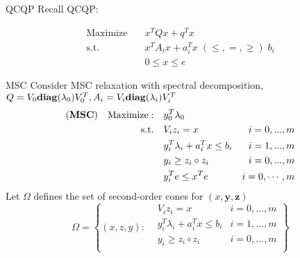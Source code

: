 

\usepackage{subfig}
\usepackage[style=authoryear]{biblatex}
\usepackage{bm}

\date{\today}




\fontsize{9pt}{11}\selectfont
\frame{\titlepage}
\begin{frame}{QCQP}
  Recall QCQP:

  \begin{equation}
    \begin{aligned}
      \mathrm{Maximize}\quad & x^TQx + q^T x                                   \\
      \mathrm{s.t.}  \quad   & x^{T} A_i x  + a_i^Tx   \; (\le, =, \ge) \; b_i \\
                             & 0\le x\le e
    \end{aligned}
  \end{equation}
\end{frame}
\begin{frame}{MSC}
  Consider MSC relaxation with spectral decomposition, \(Q =V_0 \mathbf{diag} (\lambda_0) V_0^T, A_i = V_i \mathbf{diag} (\lambda_i) V_i^T\)
  \begin{equation}\label{eq.rel.msc}
    \begin{aligned}
      (\textbf{MSC}) \quad \mathrm{Maximize: }\quad & y_0 ^T\lambda_0                                     \\
      \mathrm{s.t.} \quad                        & V_i z_i = x                        & i=0,...,m      \\
                                                 & y_i ^T\lambda_i  + a_i^Tx  \le b_i & i=1,...,m      \\
                                                 & y_i \ge z_i \circ z_i              & i=0,...,m      \\
                                                 & y_i^Te \le x^Te                    & i=0, \cdots, m
    \end{aligned}
  \end{equation}
  Let \(\Omega\) defines the set of second-order cones for \((x, \bm y, \bm z)\)
  \begin{equation}
    \Omega = \left\{ (x,z,y) :  \begin{aligned}
       & V_i z_i = x                        & i=0,...,m \\
       & y_i ^T\lambda_i  + a_i^Tx  \le b_i & i=1,...,m \\
       & y_i \ge z_i \circ z_i              & i=0,...,m \\
    \end{aligned}\right\}
  \end{equation}
\end{frame}
